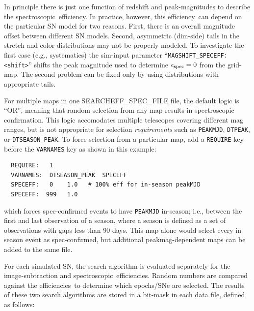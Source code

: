 \documentclass[12pt]{article}
\newcommand{\eff}{efficiency}
\newcommand{\effs}{efficiencies}
\newcommand{\simeffspec}{\epsilon_{\rm spec}}
\newcommand{\spec}{spectroscopic}
\begin{document}
{In principle there is just one function of redshift and
peak-magnitudes to describe the \spec\ \eff. In practice,
however, this \eff\ can depend on the particular SN model
for two reasons. First, there is an overall magnitude offset
between different SN models. Second, asymmetric 
(dim-side) tails in the stretch and color distributions
may not be properly modeled. To investigate the first 
case (e.g., systematics) the sim-input parameter 
``{\tt MAGSHIFT\_SPECEFF: <shift>}'' 
shifts the peak magnitude used to determine $\simeffspec=0$
from the grid-map.  The second problem can be fixed only
by using distributions with appropriate tails.

\bigskip
For multiple maps in one {SEARCHEFF\_SPEC\_FILE} file,
the default logic is ``OR'', meaning that
random selection from any map results in spectroscopic confirmation.
This logic accomodates multiple telescopes covering different
mag ranges, but is not appropriate for selection {\it requirements}
such as {\tt PEAKMJD}, {\tt DTPEAK}, or {\tt DTSEASON\_PEAK}.
To force selection from a particular map, add a {\tt REQUIRE}
key before the {\tt VARNAMES} key as shown in this example:
%
\begin{verbatim}
  REQUIRE:   1
  VARNAMES:  DTSEASON_PEAK  SPECEFF
  SPECEFF:   0    1.0   # 100% eff for in-season peakMJD
  SPECEFF:  999   1.0
\end{verbatim}
%
which forces spec-confirmed events to have {\tt PEAKMJD} in-season;
i.e., between the first and last observation of a season, where
a season is defined as a set of observations with gaps less than 90 days.
This map alone would select every in-season event as spec-confirmed,
but additional peakmag-dependent maps can be added to the same file.


\bigskip
For each simulated SN, the search algorithm
is evaluated separately for the image-subtraction
and \spec\ \effs. Random numbers are compared against
the \effs\ to determine which epochs/SNe are selected.
The results of these two search algorithms are stored
in a bit-mask in each data file, defined as follows:

}
\end{document}
